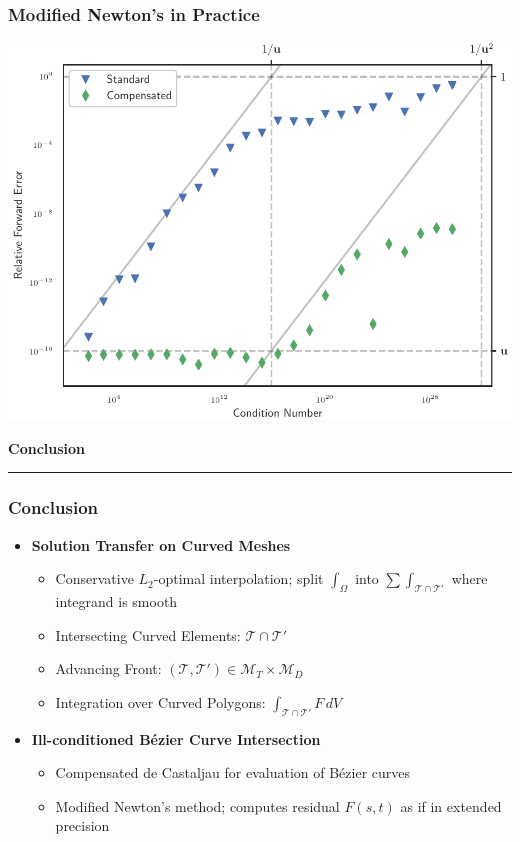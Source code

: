 \documentclass{beamer}
\begin{document}
\begin{frame}
\frametitle{Modified Newton's in Practice}
\begin{center}
\includegraphics[height=0.8\textheight]{../images/slides/almost_tangent.pdf}
\end{center}
\end{frame}


\begin{frame}
\centering
{\Large \bf Conclusion}
\rule{0.82\textwidth}{1pt}
\end{frame}

\begin{frame}
\frametitle{Conclusion}
\begin{itemize}
\pause
\item \textbf{Solution Transfer on Curved Meshes}
\begin{itemize}
\pause
\item Conservative \(L_2\)-optimal interpolation; split
  \(\displaystyle \int_{\Omega}\) into \(\displaystyle \sum \int_{\mathcal{T}
  \cap \mathcal{T}'}\) where integrand is smooth
\pause
\item Intersecting Curved Elements: \(\mathcal{T} \cap \mathcal{T}'\)
\pause
\item Advancing Front: \(\left(\mathcal{T}, \mathcal{T}'\right) \in
  \mathcal{M}_T \times \mathcal{M}_D\)
\pause
\item Integration over Curved Polygons:
  \(\displaystyle \int_{\mathcal{T} \cap \mathcal{T}'} F \, dV\)
\end{itemize}
\pause
\item \textbf{Ill-conditioned B\'{e}zier Curve Intersection}
\begin{itemize}
\pause
\item Compensated de Castaljau for evaluation of B\'{e}zier curves
\pause
\item Modified Newton's method; computes residual \(F(s, t)\) as
  if in extended precision
\end{itemize}
\end{itemize}
\end{frame}
\end{document}
